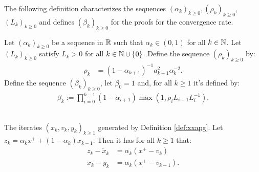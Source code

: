 \documentclass[12pt]{report}
\begin{document}
        The following definition characterizes the sequences $(\alpha_k)_{k \ge 0}, (\rho_k)_{k \ge 0}$, $(L_k)_{k \ge 0}$ and defines $(\beta_k)_{k \ge 0}$ for the proofs for the convergence rate. 
        \begin{definition}\label{def:alpha-beta-rho-seq}
            Let $(\alpha_k)_{k \ge 0}$ be a sequence in $\mathbb R$ such that $\alpha_k \in (0, 1)$ for all $k \in \mathbb N$. 
            Let $(L_k)_{k \ge 0}$ satisfy $L_k > 0$ for all $k \in \mathbb N \cup \{0\}$. 
            Define the sequence $(\rho_k)_{k \ge 0}$ by:
            \begin{align*}
               \rho_{k} &= (1 - \alpha_{k + 1})^{-1}a_{k + 1}^2\alpha_k^{-2}. 
            \end{align*}
            Define the sequence $(\beta_k)_{k \ge 0}$, let $\beta_0 = 1$ and, for all $k \ge 1$ it's defined by: 
            \begin{align*}
                \beta_k := \prod_{i = 0}^{k - 1} (1 - \alpha_{i + 1})\max\left(1, \rho_i L_{i + 1}L_i^{-1}\right). 
            \end{align*}
        \end{definition}
        \begin{lemma}\;\label{lemma:apg-iterates}\;\\
            The iterates $(x_k, v_k, y_k)_{k \ge 1}$ generated by Definition \ref{def:xxapg}. 
            Let $z_k = \alpha_k x^+ + (1 - \alpha_k)x_{k - 1}$. 
            Then it has for all $k \ge 1$ that: 
            \begin{align*}
                z_k - \tilde x_k &= \alpha_k(x^+ - v_k)
                \\
                x_k - y_k &= \alpha_k(x^+ - v_{k - 1}). 
            \end{align*}
        \end{lemma}
\end{document}
